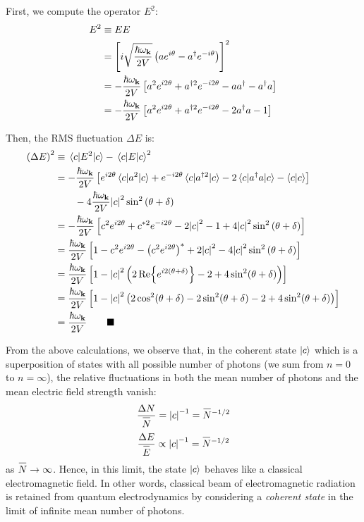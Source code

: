 \documentclass[letterpaper,12pt]{article}
\newenvironment{problem}{\subsection{}\begin{adjustwidth}{0.25in}{}\vspace{-\baselineskip}}{\end{adjustwidth}}
\newenvironment{subproblem}{\subsubsection{}\begin{adjustwidth}{0.4in}{}\vspace{-\baselineskip}}{\end{adjustwidth}}
\newcommand{\define}{\equiv}
\newcommand{\done}{\tag*{$\blacksquare$}}
\newcommand{\overbar}[1]{
	\mkern 1.5mu \overline{\mkern-1.5mu\raisebox{0pt}[\dimexpr\height+0.5mm\relax]{$#1$}\mkern-1.5mu}\mkern 1.5mu
}
\begin{document}
\begin{problem}
\begin{subproblem}
	First, we compute the operator $E^2$:
	\begin{align*}
		E^2 &\define EE	\\
		&= \left[i\sqrt{\frac{\hbar\omega_{\vb{k}}}{2V}}
		\left(ae^{i\theta} - a^\dagger e^{-i\theta}\right)\right]^2	\\
		&= -\frac{\hbar\omega_{\vb{k}}}{2V}\left[a^2 e^{i2\theta} + a^{\dagger2}e^{-i2\theta} - aa^\dagger - a^\dagger a\right]	\\
		&= -\frac{\hbar\omega_{\vb{k}}}{2V}\left[a^2 e^{i2\theta} + a^{\dagger2}e^{-i2\theta} - 2a^\dagger a - 1\right]
	\end{align*}
	
	Then, the RMS fluctuation $\Delta E$ is:
	\begin{align*}
		\left(\Delta E\right)^2 &\define
		\ev{E^2}{c} - \ev{E}{c}^2	\\
		&= -\frac{\hbar\omega_{\vb{k}}}{2V}\left[e^{i2\theta}\ev{a^2}{c} + e^{-i2\theta}\ev{a^{\dagger2}}{c} - 2\ev{a^\dagger a}{c} - \braket{c}\right]	\\
		&\qquad - 4\frac{\hbar\omega_{\vb{k}}}{2V}\abs{c}^2\sin^2\left(\theta + \delta\right)	\\
		&= -\frac{\hbar\omega_{\vb{k}}}{2V}\left[c^2e^{i2\theta} + c^{*2}e^{-i2\theta} - 2\abs{c}^2 - 1 + 4\abs{c}^2\sin^2\left(\theta+\delta\right) \right]	\\
		&= \frac{\hbar\omega_{\vb{k}}}{2V}
		\left[1 - c^2e^{i2\theta} - \left(c^2e^{i2\theta}\right)^* + 2\abs{c}^2 - 4\abs{c}^2\sin^2\left(\theta+\delta\right)\right]	\\
		&= \frac{\hbar\omega_{\vb{k}}}{2V}
		\left[1 - \abs{c}^2\left(2\Re{e^{i2(\theta+\delta)}} - 2 + 4\sin^2(\theta+\delta)\right) \right]	\\
		&= \frac{\hbar\omega_{\vb{k}}}{2V}
		\left[1 - \abs{c}^2\left(2\cos^2(\theta+\delta)-2\sin^2(\theta+\delta) - 2 + 4\sin^2(\theta+\delta)\right)\right]	\\
		&= \frac{\hbar\omega_{\vb{k}}}{2V}		\done
	\end{align*}
\end{subproblem}

From the above calculations, we observe that, in the coherent state $\ket{c}$ which is a superposition of states with all possible number of photons (we sum from $n=0$ to $n=\infty$), the relative fluctuations in both the mean number of photons and the mean electric field strength vanish:
\begin{gather*}
	\frac{\Delta N}{\overbar{N}} = \abs{c}^{-1} = \overbar{N}^{-1/2}	\\[0.5ex]
	\frac{\Delta E}{\overbar{E}} \propto \abs{c}^{-1} = \overbar{N}^{-1/2}
\end{gather*}
as $\overbar{N} \rightarrow \infty$. Hence, in this limit, the state $\ket{c}$ behaves like a classical electromagnetic field. In other words, classical beam of electromagnetic radiation is retained from quantum electrodynamics by considering a \emph{coherent state} in the limit of infinite mean number of photons.
\end{problem}
\end{document}
